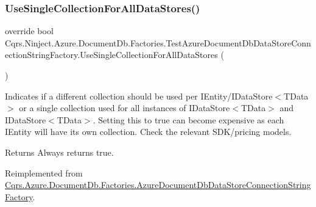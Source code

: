 \mbox{\label{classCqrs_1_1Ninject_1_1Azure_1_1DocumentDb_1_1Factories_1_1TestAzureDocumentDbDataStoreConnectionStringFactory_aeac8ecfdbb2d1d7f18105f2e535c51fe_aeac8ecfdbb2d1d7f18105f2e535c51fe}} 
\subsubsection{\texorpdfstring{Use\+Single\+Collection\+For\+All\+Data\+Stores()}{UseSingleCollectionForAllDataStores()}}
{\footnotesize\ttfamily override bool Cqrs.\+Ninject.\+Azure.\+Document\+Db.\+Factories.\+Test\+Azure\+Document\+Db\+Data\+Store\+Connection\+String\+Factory.\+Use\+Single\+Collection\+For\+All\+Data\+Stores (\begin{DoxyParamCaption}{ }\end{DoxyParamCaption})\hspace{0.3cm}{\ttfamily [virtual]}}



Indicates if a different collection should be used per I\+Entity/I\+Data\+Store$<$\+T\+Data$>$ or a single collection used for all instances of I\+Data\+Store$<$\+T\+Data$>$ and I\+Data\+Store$<$\+T\+Data$>$. Setting this to true can become expensive as each I\+Entity will have it\textquotesingle{}s own collection. Check the relevant S\+D\+K/pricing models. 

\begin{DoxyReturn}{Returns}
Always returns true.
\end{DoxyReturn}


Reimplemented from \hyperlink{classCqrs_1_1Azure_1_1DocumentDb_1_1Factories_1_1AzureDocumentDbDataStoreConnectionStringFactory_aa7b4b3eca609a815358af227b0f53909_aa7b4b3eca609a815358af227b0f53909}{Cqrs.\+Azure.\+Document\+Db.\+Factories.\+Azure\+Document\+Db\+Data\+Store\+Connection\+String\+Factory}.



